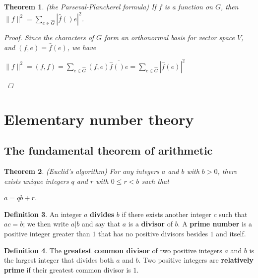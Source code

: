 \documentclass[psamsfonts]{amsart}
\newtheorem{thm}{Theorem}[section]
\theoremstyle{definition}
\newtheorem{defn}[thm]{Definition}
\theoremstyle{remark}
\numberwithin{equation}{section}
\begin{document}
			\begin{thm}
				(the Parseval-Plancherel formula)
				If $f$ is a function on $G$, then $\|f\|^2 = \sum_{e \in \hat{G}} |\hat{f}()e|^2$.
				\begin{proof}
					Since the characters of $G$ form an orthonormal basis for vector space $V$, and $(f,e) = \hat{f}(e)$, we have\\
					\begin{center}
						$\|f\|^2 = (f,f) = \sum_{e \in \hat{G}} (f,e)\overline{\hat{f}()e} = \sum_{e \in \hat{G}} |\hat{f}(e)|^2$
					\end{center}										
				\end{proof}
			\end{thm}
	
	\section{Elementary number theory}
		\vspace{5mm}
		\subsection{The fundamental theorem of arithmetic}
			\begin{thm}
				(Euclid's algorithm) For any integers $a$ and $b$ with $b > 0$, there exists unique integers $q$ and $r$ with $0 \leq r < b$ such that\\
				\begin{center}
					$a = qb +r$.
				\end{center}
			\end{thm}
							
			\begin{defn}
				An integer $a$ \textbf{divides} $b$ if there exists another integer $c$ such that $ac = b$; we then write $a|b$ and say that $a$ is a \textbf{divisor} of $b$. A \textbf{prime number} is a positive integer greater than $1$ that has no positive divisors besides $1$ and itself. 
			\end{defn}
			
			\begin{defn}
				The \textbf{greatest common divisor} of two positive integers $a$ and $b$ is the largest integer that divides both $a$ and $b$. Two positive integers are \textbf{relatively prime} if their greatest common divisor is $1$.
			\end{defn}			
			
\end{document}
